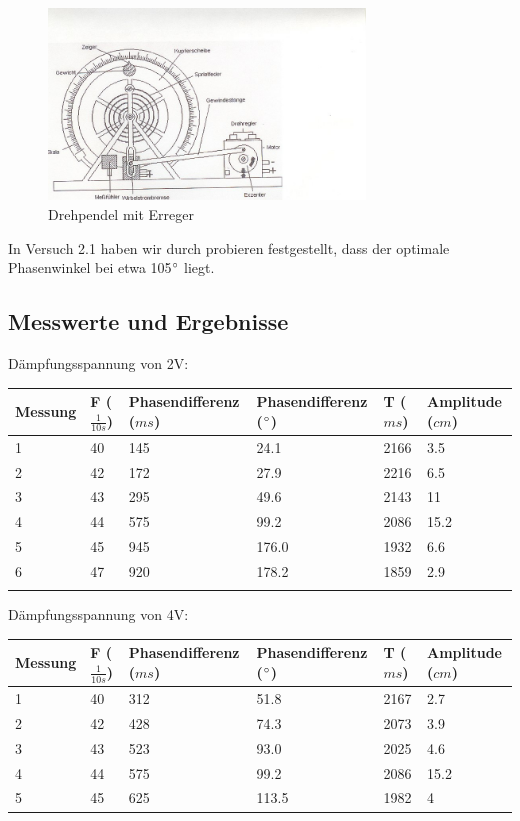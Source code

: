 \documentclass{scrartcl}
\begin{document}
\begin{figure}[h]
  \caption{Drehpendel mit Erreger}
  \centering
    \includegraphics[width=0.75\textwidth]{800px-Pohlsches_Rad}
\end{figure}

In Versuch 2.1 haben wir durch probieren festgestellt, dass der optimale Phasenwinkel bei etwa 105$\degree$ liegt. 
\subsection{Messwerte und Ergebnisse}
Dämpfungsspannung von 2V:\\
\begin{tabular}{l|l|l|l|l|l}
Messung &F ($\frac{1}{10s}$)&Phasendifferenz ($ms$)&Phasendifferenz ($\degree$)&T ($ms$)&Amplitude ($cm$)\\\hline
1&40&145&24.1&2166&3.5\\
2&42&172&27.9&2216&6.5\\
3&43&295&49.6&2143&11\\
4&44&575&99.2&2086&15.2\\
5&45&945&176.0&1932&6.6\\
6&47&920&178.2&1859&2.9\\\\
\end{tabular}

Dämpfungsspannung von 4V:\\
\begin{tabular}{l|l|l|l|l|l}
Messung &F ($\frac{1}{10s}$)&Phasendifferenz ($ms$)&Phasendifferenz ($\degree$)&T ($ms$)&Amplitude ($cm$)\\\hline
1&40&312&51.8&2167&2.7\\
2&42&428&74.3&2073&3.9\\
3&43&523&93.0&2025&4.6\\
4&44&575&99.2&2086&15.2\\
5&45&625&113.5&1982&4\\
\end{tabular}
\end{document}
